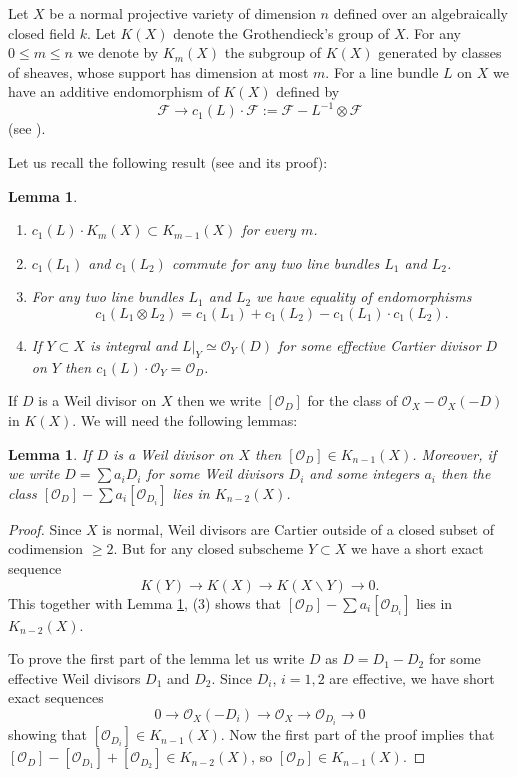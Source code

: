 \documentclass[twoside, 11pt]{article}
\theoremstyle{plain}
\newtheorem{Lemma}[Thm]{\sc Lemma}
\theoremstyle{definition}
\theoremstyle{remark}
\newcommand{\cF}{{\mathcal F}}
\newcommand{\cO}{{\mathcal O}}
\begin{document}
Let $X$ be a normal projective variety of dimension $n$ defined over an algebraically closed field $k$.
Let $K(X)$ denote the Grothendieck's group of $X$. For any $0\le m\le n$ we denote by $K_m(X)$ the subgroup of $K(X)$ generated by classes of sheaves, whose support has dimension at most $m$. For a line bundle $L$ on $X$ we have an additive endomorphism
of $K(X)$ defined by
$$\cF\to c_1(L)\cdot \cF:= \cF- L^{-1}\otimes \cF$$
(see \cite[Chapter VI, Definition 2.4]{Ko}). 

 \medskip
 
Let us recall the following result (see  \cite[Chapter VI, Proposition 2.5]{Ko} and its proof):

\begin{Lemma}\label{Kollar}
\begin{enumerate}
\item $c_1(L)\cdot K_m(X)\subset K_{m-1}(X)$ for every $m$.
\item $c_1(L_1)$ and $c_1 (L_2)$ commute for any two line bundles $L_1$ and $L_2$.
\item  For any two line bundles $L_1$ and $L_2$ we have equality of endomorphisms
$$c_1(L_1\otimes L_2)= c_1(L_1)+c_1(L_2)-c_1(L_1)\cdot c_1(L_2).$$
\item If $Y\subset X$ is integral  and $L|_Y\simeq \cO_Y (D)$ for some effective 
Cartier divisor $D$ on $Y$ then $c_1(L)\cdot \cO_Y=\cO_D$.
\end{enumerate}
\end{Lemma}


If $D$ is  a Weil divisor on $X$ then we write $[\cO_D]$ for the class of $\cO_X-\cO _X(-D)$ in $K(X)$. 
We will need the following lemmas:

\begin{Lemma}\label{difference}
If $D$ is a Weil divisor on $X$ then $[\cO_D]\in K_{n-1} (X)$.
Moreover, if  we write $D=\sum a_i D_i$ for some   Weil divisors $D_i$  and some integers $a_i$ then the class
$[\cO_D]- \sum  a_i [\cO_{D_i}]$ lies in $K_{n-2}(X)$.
\end{Lemma}

\begin{proof}
Since $X$ is normal,  Weil divisors are Cartier outside of a closed subset of codimension $\ge 2$. 
But for any closed subscheme $Y\subset X$ we have a short exact sequence
$$K(Y)\to K(X)\to K(X\backslash Y)\to 0.$$
This together with Lemma \ref{Kollar}, (3) shows that $[\cO_D]- \sum a_i [\cO_{D_i}]$ lies in $K_{n-2}(X)$.

To prove the first part of the lemma let us write $D$ as $D=D_1-D_2$ for some  effective Weil divisors $D_1$  
and $D_2$. Since $D_i$, $i=1,2$ are effective, we have short exact sequences
$$0\to \cO _X(-D_i) \to \cO _X \to \cO _{D_i}\to 0$$
showing that $[\cO_{D_i}]\in K_{n-1} (X)$. Now the first part of the proof implies that $[\cO_D]- [\cO_{D_1}]+[\cO_{D_2}]\in K_{n-2} (X)$, so  $[\cO_D]\in K_{n-1} (X)$.
\end{proof}
\end{document}
